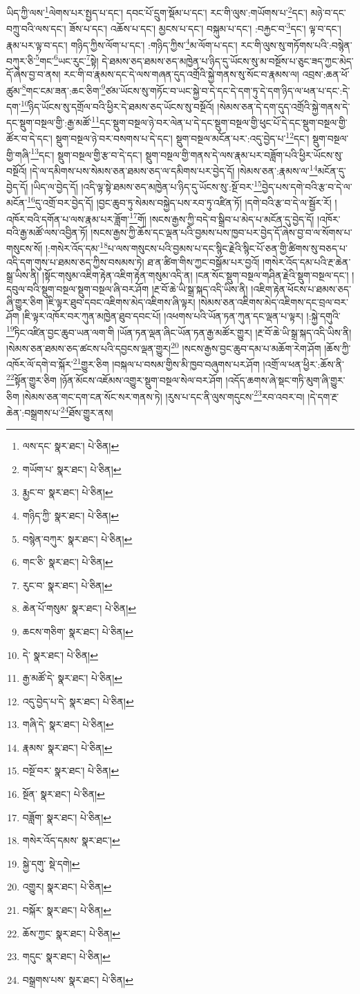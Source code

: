 ཡིད་ཀྱི་ལས་\footnote{ལས་དང་  སྣར་ཐང་།  པེ་ཅིན། }ལེགས་པར་སྤྱད་པ་དང་། དབང་པོ་དྲུག་སྡོམ་པ་དང་། རང་གི་ལུས་:གཡོགས་པ་\footnote{གཡོག་པ་  སྣར་ཐང་།  པེ་ཅིན། }དང་། མཉེ་བ་དང་བཀྲུ་བའི་ལས་དང་། ཟོས་པ་དང་། འཆོས་པ་དང་། མྱངས་པ་དང་། བསྐུམ་པ་དང་། :བརྐྱང་བ་\footnote{རྨྱང་བ་  སྣར་ཐང་།  པེ་ཅིན། }དང་། ལྟ་བ་དང་། རྣམ་པར་ལྟ་བ་དང་། གཉིད་ཀྱིས་ལོག་པ་དང་། :གཉིད་ཀྱིས་\footnote{གཉིད་ཀྱི་  སྣར་ཐང་།  པེ་ཅིན། }མ་ལོག་པ་དང་། རང་གི་ལུས་སུ་གཏོགས་པའི་:བསྙེན་བཀུར་ཅི་\footnote{བསྙེན་བཀུར་  སྣར་ཐང་།  པེ་ཅིན། }གང་\footnote{གང་ཅི་  སྣར་ཐང་།  པེ་ཅིན། }ཡང་རུང་\footnote{རུང་བ་  སྣར་ཐང་།  པེ་ཅིན། }སྟེ། དེ་ཐམས་ཅད་ཐམས་ཅད་མཁྱེན་པ་ཉིད་དུ་ཡོངས་སུ་མ་བསྔོས་པ་ཅུང་ཟད་ཀྱང་མེད་དོ་ཞེས་བྱ་བ་ནས། རང་གི་བ་རྣམས་དང་དེ་ལས་གཞན་དུད་འགྲོའི་སྐྱེ་གནས་སུ་སོང་བ་རྣམས་ལ། འབྲས་:ཆན་ཕོ་ཚུམ་\footnote{ཆེན་པོ་གསུམ་  སྣར་ཐང་།  པེ་ཅིན། }གང་ངམ་ཟན་:ཆང་ཅིག་\footnote{ཆངས་གཅིག་  སྣར་ཐང་།  པེ་ཅིན། }ཙམ་ཡོངས་སུ་གཏོང་བ་ཡང་སྐྱེ་བ་དེ་དང་དེ་དག་ཏུ་དེ་དག་ཉིད་ལ་ཕན་པ་དང་:དེ་དག་\footnote{དེ་  སྣར་ཐང་།  པེ་ཅིན། }ཉིད་ཡོངས་སུ་དགྲོལ་བའི་ཕྱིར་དེ་ཐམས་ཅད་ཡོངས་སུ་བསྔོའོ། །སེམས་ཅན་དེ་དག་དུད་འགྲོའི་སྐྱེ་གནས་དེ་དང་སྡུག་བསྔལ་གྱི་:རྒྱ་མཚོ་\footnote{རྒྱ་མཚོ་དེ་  སྣར་ཐང་།  པེ་ཅིན། }དང་སྡུག་བསྔལ་ཉེ་བར་ལེན་པ་དེ་དང་སྡུག་བསྔལ་གྱི་ཕུང་པོ་དེ་དང་སྡུག་བསྔལ་གྱི་ཚོར་བ་དེ་དང་། སྡུག་བསྔལ་ཉེ་བར་བསགས་པ་དེ་དང་། སྡུག་བསྔལ་མངོན་པར་:འདུ་བྱེད་པ་\footnote{འདུ་བྱེད་པ་དེ་  སྣར་ཐང་།  པེ་ཅིན། }དང་། སྡུག་བསྔལ་གྱི་གཞི་\footnote{གཞི་དེ་  སྣར་ཐང་།  པེ་ཅིན། }དང་། སྡུག་བསྔལ་གྱི་རྩ་བ་དེ་དང་། སྡུག་བསྔལ་གྱི་གནས་དེ་ལས་རྣམ་པར་བཟློག་པའི་ཕྱིར་ཡོངས་སུ་བསྔོའོ། །དེ་ལ་དམིགས་པས་སེམས་ཅན་ཐམས་ཅད་ལ་དམིགས་པར་བྱེད་དོ། །སེམས་ཅན་:རྣམས་ལ་\footnote{རྣམས་  སྣར་ཐང་།  པེ་ཅིན། }མངོན་དུ་བྱེད་དོ། །ཡིད་ལ་བྱེད་དོ། །འདི་ལྟ་སྟེ་ཐམས་ཅད་མཁྱེན་པ་ཉིད་དུ་ཡོངས་སུ་:སྔོ་བར་\footnote{བསྔོ་བར་  སྣར་ཐང་།  པེ་ཅིན། }བྱེད་པས་དགེ་བའི་རྩ་བ་དེ་ལ་མངོན་\footnote{སྔོན་  སྣར་ཐང་།  པེ་ཅིན། }དུ་འགྲོ་བར་བྱེད་དོ། །བྱང་ཆུབ་ཏུ་སེམས་བསྐྱེད་པས་རབ་ཏུ་འཛིན་ཏོ། །དགེ་བའི་རྩ་བ་དེ་ལ་སྦྱོར་རོ། །འཁོར་བའི་དགོན་པ་ལས་རྣམ་པར་ཟློག་\footnote{བཟློག་  སྣར་ཐང་།  པེ་ཅིན། }གོ། །སངས་རྒྱས་ཀྱི་བདེ་བ་སྒྲིབ་པ་མེད་པ་མངོན་དུ་བྱེད་དོ། །འཁོར་བའི་རྒྱ་མཚོ་ལས་འབྱིན་ཏོ། །སངས་རྒྱས་ཀྱི་ཆོས་དང་ལྡན་པའི་བྱམས་པས་ཁྱབ་པར་བྱེད་དོ་ཞེས་བྱ་བ་ལ་སོགས་པ་གསུངས་སོ། །:གསེར་འོད་དམ་\footnote{གསེར་འོད་དམས་  སྣར་ཐང་། }པ་ལས་གསུངས་པའི་བྱམས་པ་དང་སྙིང་རྗེའི་སྙིང་པོ་ཅན་གྱི་ཚིགས་སུ་བཅད་པ་འདི་དག་གུས་པ་ཐམས་ཅད་ཀྱིས་བསམས་ཏེ། ཐ་ན་ཚིག་གིས་ཀྱང་བསྒོམ་པར་བྱའོ། །གསེར་འོད་དམ་པའི་རྔ་ཆེན་སྒྲ་ཡིས་ནི། །སྟོང་གསུམ་འཇིག་རྟེན་འཇིག་རྟེན་གསུམ་འདི་ན། །ངན་སོང་སྡུག་བསྔལ་གཤིན་རྗེའི་སྡུག་བསྔལ་དང་། །དབུལ་བའི་སྡུག་བསྔལ་སྡུག་བསྔལ་ཞི་བར་ཤོག །རྔ་བོ་ཆེ་ཡི་སྒྲ་སྐད་འདི་ཡིས་ནི། །འཇིག་རྟེན་ཕོངས་པ་ཐམས་ཅད་ཞི་གྱུར་ཅིག །ཇི་ལྟར་ཐུབ་དབང་འཇིགས་མེད་འཇིགས་ཞི་ལྟར། །སེམས་ཅན་འཇིགས་མེད་འཇིགས་དང་བྲལ་བར་ཤོག །ཇི་ལྟར་འཁོར་བར་ཀུན་མཁྱེན་ཐུབ་དབང་པོ། །འཕགས་པའི་ཡོན་ཏན་ཀུན་དང་ལྡན་པ་ལྟར། །:སྐྱེ་དགུའི་\footnote{སྐྱེ་དགུ་  སྡེ་དགེ། }ཏིང་འཛིན་བྱང་ཆུབ་ཡན་ལག་གི །ཡོན་ཏན་ལྡན་ཞིང་ཡོན་ཏན་རྒྱ་མཚོར་གྱུར། །རྔ་བོ་ཆེ་ཡི་སྒྲ་སྐད་འདི་ཡིས་ནི། །སེམས་ཅན་ཐམས་ཅད་ཚངས་པའི་དབྱངས་ལྡན་གྱུར།\footnote{འགྱུར།  སྣར་ཐང་།  པེ་ཅིན། } །སངས་རྒྱས་བྱང་ཆུབ་དམ་པ་མཆོག་རེག་ཤོག །ཆོས་ཀྱི་འཁོར་ལོ་དགེ་བ་སྐོར་\footnote{བསྐོར་  སྣར་ཐང་།  པེ་ཅིན། }གྱུར་ཅིག །བསྐལ་པ་བསམ་གྱིས་མི་ཁྱབ་བཞུགས་པར་ཤོག །འགྲོ་ལ་ཕན་ཕྱིར་:ཆོས་ནི་\footnote{ཆོས་ཀྱང་  སྣར་ཐང་།  པེ་ཅིན། }སྟོན་གྱུར་ཅིག །ཉོན་མོངས་འཇོམས་འགྱུར་སྡུག་བསྔལ་སེལ་བར་ཤོག །འདོད་ཆགས་ཞེ་སྡང་གཏི་མུག་ཞི་གྱུར་ཅིག །སེམས་ཅན་གང་དག་ངན་སོང་སར་གནས་ཏེ། །རུས་པ་དང་ནི་ལུས་གདུངས་\footnote{གདུང་  སྣར་ཐང་།  པེ་ཅིན། }རབ་འབར་བ། །དེ་དག་རྔ་ཆེན་:བསྒྲགས་པ་\footnote{བསྒྲགས་པས་  སྣར་ཐང་།  པེ་ཅིན། }ཐོས་གྱུར་ནས། 